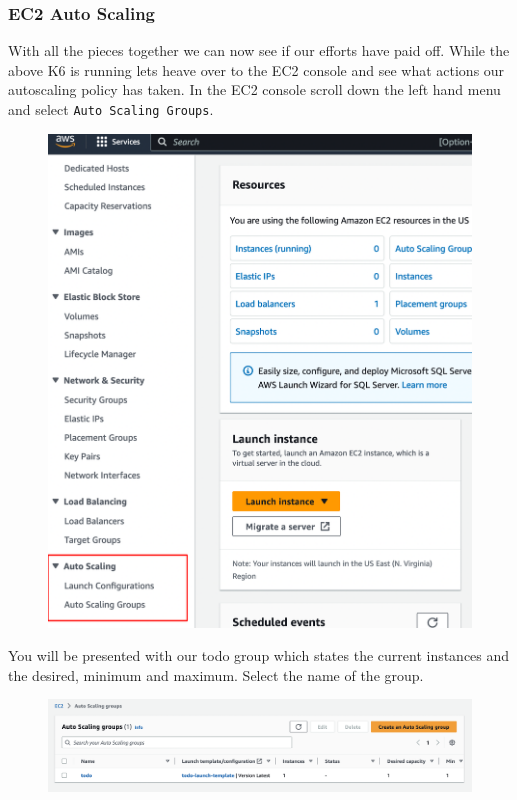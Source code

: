 \documentclass{csse4400}
\begin{document}
\subsubsection{EC2 Auto Scaling}

With all the pieces together we can now see if our efforts have paid off. While the above K6 is running lets heave over to the EC2 console and see what actions our autoscaling policy has taken. In the EC2 console scroll down the left hand menu and select \texttt{Auto Scaling Groups}.

\begin{figure}[H]
  \begin{center}
    \includegraphics[scale=0.5]{images/ec2_1}
  \end{center}
\end{figure}

You will be presented with our todo group which states the current instances and the desired, minimum and maximum. Select the name of the group.

\begin{figure}[H]
  \begin{center}
    \includegraphics[width=\textwidth]{images/ec2_3}
  \end{center}
\end{figure}
\end{document}
